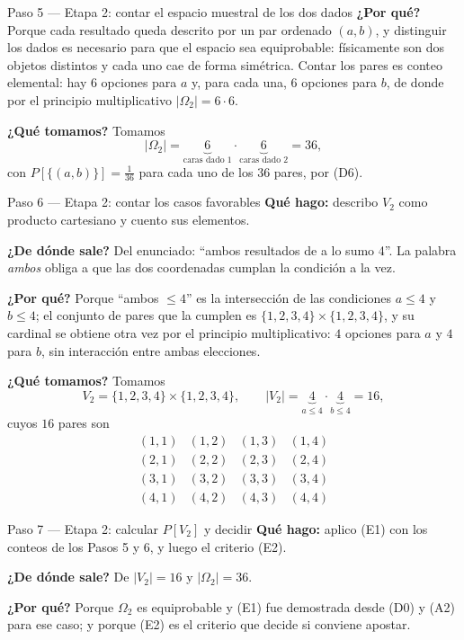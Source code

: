 \documentclass[11pt]{article}
\begin{document}
\begin{sol}
\begin{paso}{Paso 5 --- Etapa 2: contar el espacio muestral de los dos dados}
\textbf{¿Por qué?} Porque cada resultado queda descrito por un par ordenado $(a,b)$, y
distinguir los dados es necesario para que el espacio sea equiprobable: físicamente son dos
objetos distintos y cada uno cae de forma simétrica. Contar los pares es conteo elemental: hay
$6$ opciones para $a$ y, para cada una, $6$ opciones para $b$, de donde por el principio
multiplicativo $|\Omega_2|=6\cdot 6$.

\textbf{¿Qué tomamos?} Tomamos
\[
|\Omega_2|=\underbrace{6}_{\text{caras dado }1}\cdot\underbrace{6}_{\text{caras dado }2}=36 ,
\]
con $P[\{(a,b)\}]=\frac{1}{36}$ para cada uno de los $36$ pares, por (D6).
\end{paso}

\begin{paso}{Paso 6 --- Etapa 2: contar los casos favorables}
\textbf{Qué hago:} describo $V_2$ como producto cartesiano y cuento sus elementos.

\textbf{¿De dónde sale?} Del enunciado: ``ambos resultados de a lo sumo 4''. La palabra
\emph{ambos} obliga a que las dos coordenadas cumplan la condición a la vez.

\textbf{¿Por qué?} Porque ``ambos $\le 4$'' es la intersección de las condiciones $a\le 4$ y
$b\le 4$; el conjunto de pares que la cumplen es $\{1,2,3,4\}\times\{1,2,3,4\}$, y su cardinal
se obtiene otra vez por el principio multiplicativo: $4$ opciones para $a$ y $4$ para $b$, sin
interacción entre ambas elecciones.

\textbf{¿Qué tomamos?} Tomamos
\[
V_2=\{1,2,3,4\}\times\{1,2,3,4\},
\qquad
|V_2|=\underbrace{4}_{a\le 4}\cdot\underbrace{4}_{b\le 4}=16 ,
\]
cuyos $16$ pares son
\[
\begin{array}{cccc}
(1,1)&(1,2)&(1,3)&(1,4)\\
(2,1)&(2,2)&(2,3)&(2,4)\\
(3,1)&(3,2)&(3,3)&(3,4)\\
(4,1)&(4,2)&(4,3)&(4,4)
\end{array}
\]
\end{paso}

\begin{paso}{Paso 7 --- Etapa 2: calcular $P[V_2]$ y decidir}
\textbf{Qué hago:} aplico (E1) con los conteos de los Pasos 5 y 6, y luego el criterio (E2).

\textbf{¿De dónde sale?} De $|V_2|=16$ y $|\Omega_2|=36$.

\textbf{¿Por qué?} Porque $\Omega_2$ es equiprobable y (E1) fue demostrada desde (D0) y (A2)
para ese caso; y porque (E2) es el criterio que decide si conviene apostar.


\end{paso}
\end{sol}
\end{document}
